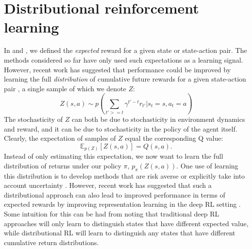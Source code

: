 \section*{Distributional reinforcement learning}
\label{sec:distributional}

In  and , we defined the \emph{expected} reward for a given state or state-action pair.
The methods considered so far have only used such expectations as a learning signal.
However, recent work has suggested that performance could be improved by learning the full \emph{distribution} of cumulative future rewards for a given state-action pair \citep{bellemare2017distributional, bellemare2023distributional,dabney2018distributional}, a single sample of which we denote $Z$:
\begin{equation}
    Z(s, a) \sim p \left ( \sum_{t' >= t} \gamma^{t' - t} r_{t'} | s_t = s, a_t = a \right )
\end{equation}
The stochasticity of $Z$ can both be due to stochasticity in environment dynamics and reward, and it can be due to stochasticity in the policy of the agent itself.
Clearly, the expectation of samples of $Z$ equal the corresponding Q value:
\begin{equation}
    \mathbb{E}_{p(Z)} \left [ Z(s, a) \right ] = Q(s, a).
\end{equation}
Instead of only estimating this expectation, we now want to learn the full distribution of returns under our policy $\pi$, $p_\pi(Z(s, a))$.
One use of learning this distribution is to develop methods that are risk averse \citep{morimura2010nonparametric,morimura2012parametric} or explicitly take into account uncertainty \citep{dearden1998bayesian}.
However, recent work has suggested that such a distributional approach can also lead to improved performance in terms of expected rewards by improving representation learning in the deep RL setting \citep{bellemare2017distributional,dabney2018distributional,rowland2019statistics,bellemare2023distributional}.
Some intuition for this can be had from noting that traditional deep RL approaches will only learn to distinguish states that have different expected value, while distributional RL will learn to distinguish any states that have different cumulative return distributions.

